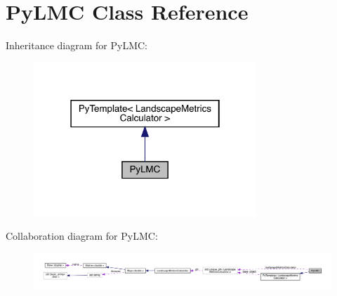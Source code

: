 \hypertarget{class_py_l_m_c}{}\section{Py\+L\+MC Class Reference}
\label{class_py_l_m_c}


Inheritance diagram for Py\+L\+MC\+:
\nopagebreak
\begin{figure}[H]
\begin{center}
\leavevmode
\includegraphics[width=238pt]{class_py_l_m_c__inherit__graph}
\end{center}
\end{figure}


Collaboration diagram for Py\+L\+MC\+:
\nopagebreak
\begin{figure}[H]
\begin{center}
\leavevmode
\includegraphics[width=350pt]{class_py_l_m_c__coll__graph}
\end{center}
\end{figure}

